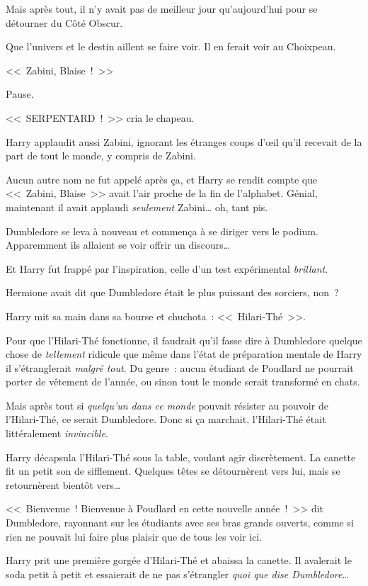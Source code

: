 Mais après tout, il n'y avait pas de meilleur jour qu'aujourd'hui pour se détourner du Côté Obscur.

Que l'univers et le destin aillent se faire voir. Il en ferait voir au Choixpeau.

<<~Zabini, Blaise~!~>>

Pause.

<<~SERPENTARD~!~>> cria le chapeau.

Harry applaudit aussi Zabini, ignorant les étranges coups d'œil qu'il recevait de la part de tout le monde, y compris de Zabini.

Aucun autre nom ne fut appelé après ça, et Harry se rendit compte que <<~Zabini, Blaise~>> avait l'air proche de la fin de l'alphabet. Génial, maintenant il avait applaudi \emph{seulement} Zabini… oh, tant pis.

Dumbledore se leva à nouveau et commença à se diriger vers le podium. Apparemment ils allaient se voir offrir un discours…

Et Harry fut frappé par l'inspiration, celle d'un test expérimental \emph{brillant}.

Hermione avait dit que Dumbledore était le plus puissant des sorciers, non~?

Harry mit sa main dans sa bourse et chuchota~: <<~Hilari-Thé~>>.

Pour que l'Hilari-Thé fonctionne, il faudrait qu'il fasse dire à Dumbledore quelque chose de \emph{tellement} ridicule que même dans l'état de préparation mentale de Harry il s'étranglerait \emph{malgré tout}. Du genre~: aucun étudiant de Poudlard ne pourrait porter de vêtement de l'année, ou sinon tout le monde serait transformé en chats.

Mais après tout si \emph{quelqu'un dans ce monde} pouvait résister au pouvoir de l'Hilari-Thé, ce serait Dumbledore. Donc si ça marchait, l'Hilari-Thé était littéralement \emph{invincible}.

Harry décapsula l'Hilari-Thé sous la table, voulant agir discrètement. La canette fit un petit son de sifflement. Quelques têtes se détournèrent vers lui, mais se retournèrent bientôt vers…

<<~Bienvenue~! Bienvenue à Poudlard en cette nouvelle année~!~>> dit Dumbledore, rayonnant sur les étudiants avec ses bras grands ouverts, comme si rien ne pouvait lui faire plus plaisir que de tous les voir ici.

Harry prit une première gorgée d'Hilari-Thé et abaissa la canette. Il avalerait le soda petit à petit et essaierait de ne pas s'étrangler \emph{quoi que dise Dumbledore}…

